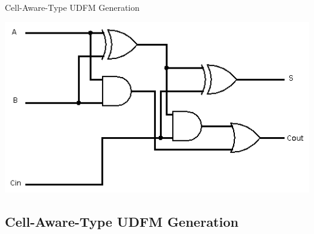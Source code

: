 \documentclass{beamer}
\begin{document}
\begin{frame}{Cell-Aware-Type UDFM Generation}

\begin{center}
\includegraphics[scale=0.5]{Images/fulladder.png}
\end{center}
\end{frame}

\subsection{Cell-Aware-Type UDFM Generation}
\end{document}
